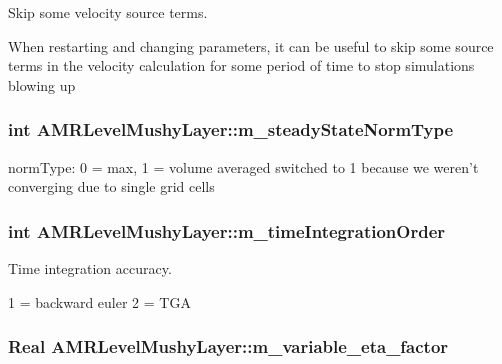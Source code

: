 Skip some velocity source terms. 

When restarting and changing parameters, it can be useful to skip some source terms in the velocity calculation for some period of time to stop simulations blowing up \hypertarget{class_a_m_r_level_mushy_layer_ac4fc74a2eaea0389f94d8e36513b8773}{
\subsubsection[{m\-\_\-steady\-State\-Norm\-Type}]{\setlength{\rightskip}{0pt plus 5cm}int A\-M\-R\-Level\-Mushy\-Layer\-::m\-\_\-steady\-State\-Norm\-Type\hspace{0.3cm}{\ttfamily [protected]}}}\label{class_a_m_r_level_mushy_layer_ac4fc74a2eaea0389f94d8e36513b8773}
norm\-Type\-: 0 = max, 1 = volume averaged switched to 1 because we weren't converging due to single grid cells \hypertarget{class_a_m_r_level_mushy_layer_a760063c20ec9abb7820afc11cafad1ab}{
\subsubsection[{m\-\_\-time\-Integration\-Order}]{\setlength{\rightskip}{0pt plus 5cm}int A\-M\-R\-Level\-Mushy\-Layer\-::m\-\_\-time\-Integration\-Order\hspace{0.3cm}{\ttfamily [protected]}}}\label{class_a_m_r_level_mushy_layer_a760063c20ec9abb7820afc11cafad1ab}


Time integration accuracy. 

1 = backward euler 2 = T\-G\-A \hypertarget{class_a_m_r_level_mushy_layer_ae2655a0f1abc12048154f60bfca18110}{
\subsubsection[{m\-\_\-variable\-\_\-eta\-\_\-factor}]{\setlength{\rightskip}{0pt plus 5cm}Real A\-M\-R\-Level\-Mushy\-Layer\-::m\-\_\-variable\-\_\-eta\-\_\-factor\hspace{0.3cm}{\ttfamily [protected]}}}\label{class_a_m_r_level_mushy_layer_ae2655a0f1abc12048154f60bfca18110}


